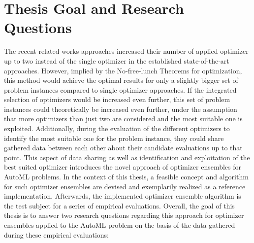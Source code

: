 \section{Thesis Goal and Research Questions}
\label{sec:intro:goal}
The recent related works approaches increased their number of applied optimizer up to two instead of the single optimizer in the established state-of-the-art approaches.
However, implied by the No-free-lunch Theorems for optimization, this method would achieve the optimal results for only a slightly bigger set of problem instances compared to single optimizer approaches.\newline
If the integrated selection of optimizers would be increased even further, this set of problem instances could theoretically be increased even further, under the assumption that more optimizers than just two are considered and the most suitable one is exploited.
Additionally, during the evaluation of the different optimizers to identify the most suitable one for the problem instance, they could share gathered data between each other about their candidate evaluations up to that point.\newline
This aspect of data sharing as well as identification and exploitation of the best suited optimizer introduces the novel approach of optimizer ensembles for AutoML problems.
In the context of this thesis, a feasible concept and algorithm for such optimizer ensembles are devised and exemplarily realized as a reference implementation.
Afterwards, the implemented optimizer ensemble algorithm is the test subject for a series of empirical evaluations.\newline
Overall, the goal of this thesis is to answer two research questions regarding this approach for optimizer ensembles applied to the AutoML problem on the basis of the data gathered during these empirical evaluations:
